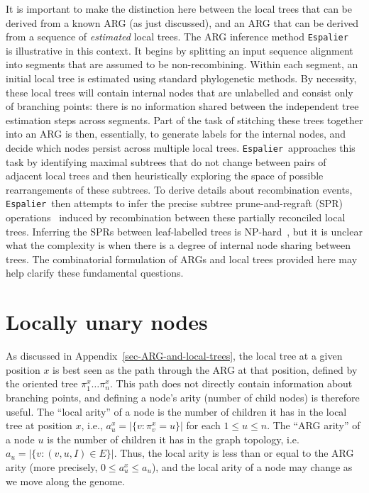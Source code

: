 \documentclass[9pt,twocolumn,twoside]{gsajnl}
\newcommand{\espalier}[0]{\texttt{Espalier}}
\newcommand{\arbores}[0]{\texttt{Arbores}}
\begin{document}
It is important to make the distinction here between the local
trees that can be derived from a known ARG (as just discussed),
and an ARG that can be derived from a sequence of \emph{estimated}
local trees.
The ARG inference method
\espalier~\citep{rasmussen2022espalier} is illustrative in this context.
It begins by splitting an input sequence alignment into
segments that are assumed to be non-recombining. Within
each segment, an initial local tree is estimated using
standard phylogenetic methods. By necessity, these local
trees will contain internal nodes that are unlabelled and
consist only of branching points: there is no information
shared between the independent tree estimation steps
across segments. Part of the task of stitching
these trees together
into an ARG is then, essentially, to generate labels for
the internal nodes, and decide which nodes persist
across multiple local trees.
\espalier\ approaches this task
by identifying maximal subtrees
that do not change between pairs of adjacent
local trees and then
heuristically exploring the space of possible
rearrangements of these subtrees.
To derive details about recombination events,
\espalier\ then attempts to infer
the precise subtree prune-and-regraft (SPR)
operations~\citep{hein1990reconstructing,song2003on,song2006properties}
induced by recombination between these partially reconciled local trees.
Inferring the SPRs between leaf-labelled trees is
NP-hard~\citep{hein1996complexity,allen2001subtree,bordewich2005computational},
but it is unclear what the complexity is when there
is a degree of internal node sharing between trees.
The combinatorial formulation of ARGs and local trees provided here
may help clarify these fundamental questions.


\section{Locally unary nodes}
\label{sec-locally-unary-edges}
As discussed in Appendix~\ref{sec-ARG-and-local-trees}, the local tree at a given position
$x$ is best seen as the path through the ARG at that position, defined
by the oriented tree $\pi^x_1\dots\pi^x_n$. This path does not directly
contain information about branching points, and defining a
node's arity (number of child nodes) is therefore useful.
The ``local arity'' of a node is the number of children it has
in the local tree at position $x$, i.e., $a^x_u = |\{v : \pi^x_v = u\}|$
for each $1 \leq u \leq n$. The ``ARG arity'' of a node $u$ is the
number of children it has in the graph topology, i.e.\
$a_u = |\{v: (v, u, I) \in E\}|$. Thus, the local arity is less than
or equal to the ARG arity (more precisely, $0 \leq a^x_u \leq a_u$),
and the local arity of a node may change as we move along the genome.
\end{document}
